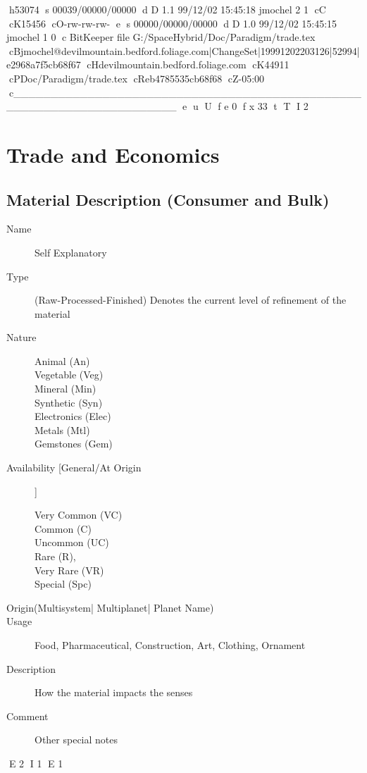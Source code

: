 h53074
s 00039/00000/00000
d D 1.1 99/12/02 15:45:18 jmochel 2 1
cC
cK15456
cO-rw-rw-rw-
e
s 00000/00000/00000
d D 1.0 99/12/02 15:45:15 jmochel 1 0
c BitKeeper file G:/SpaceHybrid/Doc/Paradigm/trade.tex
cBjmochel@devilmountain.bedford.foliage.com|ChangeSet|19991202203126|52994|e2968a7f5cb68f67
cHdevilmountain.bedford.foliage.com
cK44911
cPDoc/Paradigm/trade.tex
cReb4785535cb68f68
cZ-05:00
c______________________________________________________________________
e
u
U
f e 0
f x 33
t
T
I 2
\chapter{Trade and Economics}

\section{Material Description (Consumer and Bulk) }

\begin{description}
	\item[Name]
	Self Explanatory
	\item[Type]
	(Raw-Processed-Finished)
	Denotes the current level of refinement of the material
	\item[Nature]
	\begin{description}
		\item[Animal (An)]
		\item[Vegetable (Veg)]
		\item[Mineral (Min)]
		\item[Synthetic (Syn)]
		\item[Electronics (Elec)]
		\item[Metals (Mtl)]
		\item[Gemstones (Gem)]
	\end{description}
	\item[Availability [General/At Origin] ]
	\begin{description}
		\item[Very Common (VC)]
		\item[Common (C)]
		\item[Uncommon (UC)]
		\item[Rare (R), ]
		\item[Very Rare (VR)]
		\item[Special (Spc)  ]
	\end{description}
	\item[Origin(Multisystem| Multiplanet| Planet Name)]
	\item[Usage]
	Food, Pharmaceutical, Construction, Art, Clothing, Ornament
	\item[Description]
	How the material impacts the senses
	\item[Comment]
	Other special notes
\end{description}


E 2
I 1
E 1
